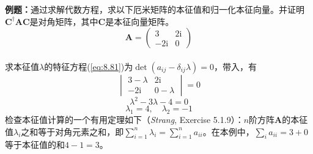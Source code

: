     \begin{examplebox}
        \textbf{例题：}通过求解代数方程，求以下厄米矩阵的本征值和归一化本征向量。并证明$\mathbf{C}^{\dagger}\mathbf{A}\mathbf{C}$是对角矩阵，其中$\mathbf{C}$是本征向量矩阵。
        \begin{equation*}
            \mathbf{A} = \begin{pmatrix}
                3 & 2\mathrm{i} \\
                -2\mathrm{i} & 0
            \end{pmatrix}
        \end{equation*}
        \\

        求本征值$\lambda$的特征方程(\ref{eq:8.81})为$\det(a_{ij} - \delta_{ij}\lambda) = 0$，带入，有
        \begin{equation*}
            \begin{vmatrix}
                3 - \lambda & 2\mathrm{i} \\
                -2\mathrm{i} & 0 - \lambda
            \end{vmatrix} = 0
        \end{equation*}
        \begin{equation*}
            \lambda^2 - 3\lambda - 4 = 0
        \end{equation*}
        \begin{equation*}
            \lambda_1 = 4, \quad \lambda_2 = -1
        \end{equation*}
        检查本征值计算的一个有用定理如下（\textit{Strang}, Exercise 5.1.9）：$n$阶方阵$\mathbf{A}$的本征值$\lambda_i$之和等于对角元素之和，即$\sum_{i=1}^{n}\lambda_i = \sum_{i=1}^{n}a_{ii}$。在本例中，$\sum_i a_{ii} = 3 + 0$等于本征值的和$4 - 1 = 3$。


\end{examplebox}
